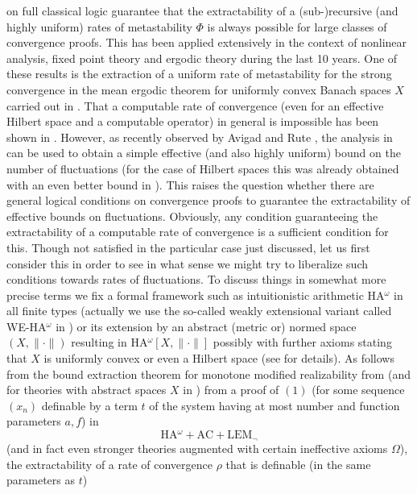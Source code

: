\documentclass[1p]{elsarticle}
\theoremstyle{plain}
\theoremstyle{definition}
\theoremstyle{remark}
\theoremstyle{definition}
\begin{document}
on full classical logic guarantee that the extractability of a (sub-)recursive 
(and highly uniform) rates of metastability $\Phi$ is always possible for 
large classes of convergence proofs. This has been applied extensively in 
the context of nonlinear analysis, fixed point theory and ergodic theory 
during the last 10 years. One of these results is the extraction of a 
uniform rate of metastability for the strong convergence in the mean 
ergodic theorem for uniformly convex Banach spaces $X$ carried out in 
\cite{Kohlenbach/Leustean4}. That a computable rate of convergence (even 
for an effective Hilbert space and a computable operator) in general 
is impossible has been shown in \cite{Avigad/Gerhardy/Towsner}. However, 
as recently observed by Avigad and Rute \cite{Avigad/Rute}, the analysis 
in \cite{Kohlenbach/Leustean4} can be used to obtain a simple effective (and 
also highly uniform) 
bound on the number of fluctuations (for the case of Hilbert spaces this 
was already obtained with an even better bound in \cite{Jones}). This 
raises the question whether there are general logical conditions on 
convergence proofs to guarantee the extractability of effective bounds 
on fluctuations. Obviously, any condition guaranteeing the extractability of 
a computable rate of convergence is a sufficient condition for this. Though 
not satisfied in the particular case just discussed, let us first consider 
this in order to see in what sense we might try to liberalize such conditions 
towards rates of fluctuations. To discuss things in somewhat more precise 
terms we fix a formal framework such as intuitionistic arithmetic 
HA$^{\omega}$ in all finite types (actually we use the so-called weakly 
extensional variant called WE-HA$^{\omega}$ in \cite{Kohlenbach(book)}) 
or its extension by an abstract (metric or) 
normed space $(X,\|\cdot\|)$ resulting 
in HA$^{\omega}[X,\|\cdot\|]$ possibly with further axioms stating that 
$X$ is uniformly convex or even a Hilbert space (see \cite{Kohlenbach(book)} 
for details). 
As follows from the bound extraction theorem for monotone modified 
realizability from \cite{Kohlenbach(book)} (and for theories with 
abstract spaces $X$ in \cite{GerKoh06}) from a proof of $(1)$ (for 
some sequence $(x_n)$ definable by a term $t$ of the system having at most 
number and function parameters $a,f$) in 
\[ \mbox{HA$^{\omega} +$AC$+$LEM}_{\neg} \] 
(and in fact even stronger theories augmented with certain ineffective 
axioms $\Omega$), the extractability of a rate of convergence $\rho$ that 
is definable (in the same parameters as $t$) 
\end{document}
